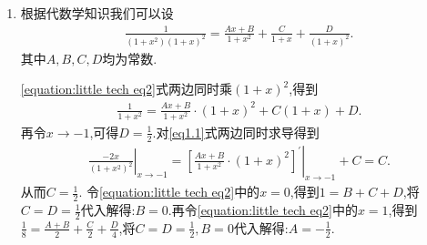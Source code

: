 \documentclass[../../main.tex]{subfiles}%
\begin{document}
\begin{solution}
\begin{enumerate}
于是原式可分解为
\begin{align*}
\frac{1}{\left( 1+x^2 \right) \left( 1+ax \right)}=\frac{-\frac{a}{1+a^2}x+\frac{1}{1+a^2}}{1+x^2}+\frac{\frac{a^2}{1+a^2}}{1+ax}.
\end{align*}
{\color{blue}解法三(留数法+待定系数法):}

\eqref{equation:little tech eq1}式两边同时乘$1+ax$,得到$\frac{1}{1+x^2}=\frac{Ax+B}{1+x^2}\cdot \left( 1+ax \right) +C$.再令$x\to-\frac{1}{a}$,得$C=\frac{1}{1+\frac{1}{a^2}}=\frac{a^2}{1+a^2}$.

容易直接观察出\eqref{equation:little tech eq1}式右边通分后分子的最高次项系数为$Aa+C$,常数项为$B+C$.并将其与\eqref{equation:little tech eq1}式左边的分子对比,可以得到
\begin{align*}
\begin{cases}
Aa+C=0\\
B+C=1\\
\end{cases}
\end{align*}
解得:$A=-\frac{a}{1+a^2},B=\frac{1}{1+a^2}$.

于是原式可分解为
\begin{align*}
\frac{1}{\left( 1+x^2 \right) \left( 1+ax \right)}=\frac{-\frac{a}{1+a^2}x+\frac{1}{1+a^2}}{1+x^2}+\frac{\frac{a^2}{1+a^2}}{1+ax}.
\end{align*}

\item 根据代数学知识我们可以设
\begin{align}\label{equation:little tech eq2}
\frac{1}{\left( 1+x^2 \right) \left( 1+x \right) ^2}=\frac{Ax+B}{1+x^2}+\frac{C}{1+x}+\frac{D}{\left( 1+x \right) ^2}.  
\end{align}
其中$A,B,C,D$均为常数.

\eqref{equation:little tech eq2}式两边同时乘$(1+x)^2$,得到
\begin{align}\label{eq1.1}
\frac{1}{1+x^2}=\frac{Ax+B}{1+x^2}\cdot \left( 1+x \right) ^2+C\left( 1+x \right)+D.
\end{align}
再令$x\to-1$,可得$D=\frac{1}{2}$.对\eqref{eq1.1}式两边同时求导得到
\begin{align*}
\left.\frac{-2x}{\left( 1+x^2 \right) ^2}\right|_{x\rightarrow -1}^{}=\left.\left[ \frac{Ax+B}{1+x^2}\cdot \left( 1+x \right) ^2 \right] ^{\prime}\right|_{x\rightarrow -1}+C=C.
\end{align*}
从而$C=\frac{1}{2}$.
令\eqref{equation:little tech eq2}中的$x=0$,得到$1=B+C+D$,将$C=D=\frac{1}{2}$代入解得:$B=0$.再令\eqref{equation:little tech eq2}中的$x=1$,得到$\frac{1}{8}=\frac{A+B}{2}+\frac{C}{2}+\frac{D}{4}$,将$C=D=\frac{1}{2},B=0$代入解得:$A=-\frac{1}{2}$.


\end{enumerate}
\end{solution}
\end{document}
